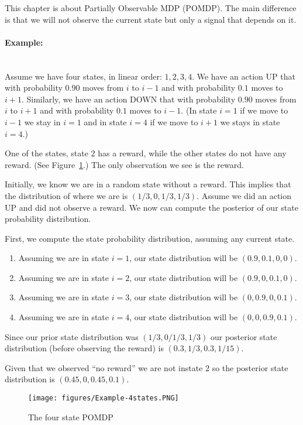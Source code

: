 
This chapter is about Partially Observable MDP (POMDP). The
main difference is that we will not observe the current state but
only a signal that depends on it.


\paragraph{Example:}\ \\
Assume we have four states, in linear order: $1,2,3,4$. We have an
action UP that with probability $0.90$ moves from $i$ to $i-1$ and
with probability $0.1$ moves to $i+1$. Similarly, we have an action
DOWN that with probability $0.90$ moves from $i$ to $i+1$ and with
probability $0.1$ moves to $i-1$. (In state $i=1$ if we move
to $i-1$ we stay in $i=1$ and in state $i=4$ if we move to
$i+1$ we stays in state $i=4$.)

One of the states, state $2$ has a reward, while the other states do
not have any reward. (See Figure~\ref{fig:Example-4states}.) The
only observation we see is the reward.

Initially, we know we are in a random state without a reward. This
implies that the distribution of where we are is $(1/3,0,1/3,1/3)$.
Assume we did an action UP and did not observe a reward. We now can
compute the posterior of our state probability distribution.

First, we compute the state probability distribution, assuming any
current state.
\begin{enumerate}
\item
Assuming we are in state $i=1$, our state distribution will be
$(0.9,0.1,0,0)$.
\item
Assuming we are in state $i=2$, our state distribution will be
$(0.9,0,0.1,0)$.
\item
Assuming we are in state $i=3$, our state distribution will be
$(0,0.9,0,0.1)$.
\item
Assuming we are in state $i=4$, our state distribution will be
$(0,0,0.9,0.1)$.
\end{enumerate}

Since our prior state distribution was $(1/3,0/1/3,1/3)$ our
posterior state distribution (before observing the reward) is
$(0.3,1/3,0.3,1/15)$.

Given that we observed ``no reward'' we are not instate $2$ so the
posterior state distribution is $(0.45,0,0.45,0.1)$.


\begin{figure}
  \begin{centering}
  \texttt{[image: figures/Example-4states.PNG]}\\
  \caption{The four state POMDP}\label{fig:Example-4states}
  \end{centering}
\end{figure}


